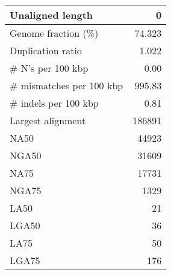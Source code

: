 \documentclass[12pt,a4paper]{article}
\begin{document}
\begin{table}[ht]
\begin{center}
\begin{tabular}{|l*{1}{|r}|}
Unaligned length & 0 \\ \hline
Genome fraction (\%) & 74.323 \\ \hline
Duplication ratio & 1.022 \\ \hline
\# N's per 100 kbp & 0.00 \\ \hline
\# mismatches per 100 kbp & 995.83 \\ \hline
\# indels per 100 kbp & 0.81 \\ \hline
Largest alignment & 186891 \\ \hline
NA50 & 44923 \\ \hline
NGA50 & 31609 \\ \hline
NA75 & 17731 \\ \hline
NGA75 & 1329 \\ \hline
LA50 & 21 \\ \hline
LGA50 & 36 \\ \hline
LA75 & 50 \\ \hline
LGA75 & 176 \\ \hline
\end{tabular}
\end{center}
\end{table}
\end{document}
